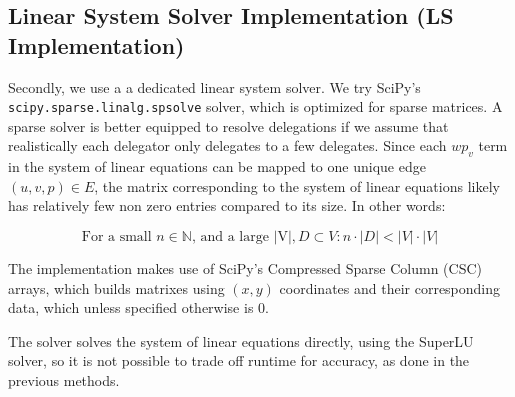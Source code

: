 
\subsection{Linear System Solver Implementation (LS Implementation)}

Secondly, we use a a dedicated linear system solver. We try SciPy's \texttt{scipy.sparse.linalg.spsolve} solver, which is optimized for sparse matrices. A sparse solver is better equipped to resolve delegations if we assume that realistically each delegator only delegates to a few delegates. Since each $wp_v$ term in the system of linear equations can be mapped to one unique edge $(u, v, p) \in E$, the matrix corresponding to the system of linear equations likely has relatively few non zero entries compared to its size. In other words:

\[
\text{For a small } n \in \mathbb{N} \text{, and a large |V|}, D \subset V: n \cdot |D| < |V| \cdot |V|
\]

 
 The implementation makes use of SciPy's Compressed Sparse Column (CSC) arrays, which builds matrixes using $(x,y)$ coordinates and their corresponding data, which unless specified otherwise is 0. 
 

The solver solves the system of linear equations directly, using the SuperLU solver, so it is not possible to trade off runtime for accuracy, as done in the previous methods. 



